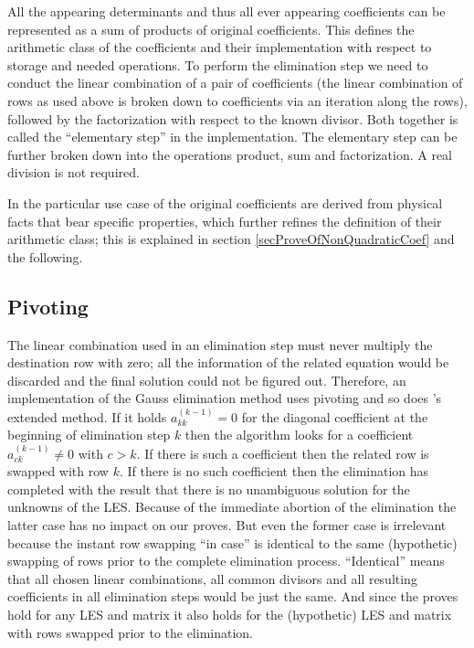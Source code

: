 All the appearing determinants and thus all ever appearing coefficients
can be represented as a sum of products of original coefficients. This
defines the arithmetic class of the coefficients and their implementation
with respect to storage and needed operations. To perform the elimination
step we need to conduct the linear combination of a pair of coefficients
(the linear combination of rows as used above is broken down to
coefficients via an iteration along the rows), followed by the
factorization with respect to the known divisor. Both together is called
the ``elementary step'' in the implementation. The elementary step can be
further broken down into the operations product, sum and factorization. A
real division is not required.

In the particular use case of \linnet{} the original coefficients are
derived from physical facts that bear specific properties, which further
refines the definition of their arithmetic class; this is explained in
section \ref{secProveOfNonQuadraticCoef} and the following.


\subsection{Pivoting}

The linear combination used in an elimination step must never multiply the
destination row with zero; all the information of the related equation
would be discarded and the final solution could not be figured out.
Therefore, an implementation of the Gauss elimination method uses pivoting
and so does \linnet{}'s extended method. If it holds $a^{(k-1)}_{kk} = 0$
for the diagonal coefficient at the beginning of elimination step $k$ then
the algorithm looks for a coefficient $a^{(k-1)}_{ck} \neq 0$ with $c >
k$. If there is such a coefficient then the related row is swapped with
row $k$. If there is no such coefficient then the elimination has
completed with the result that there is no unambiguous solution for the
unknowns of the LES. Because of the immediate abortion of the elimination
the latter case has no impact on our proves. But even the former case is
irrelevant because the instant row swapping ``in case'' is identical to
the same (hypothetic) swapping of rows prior to the complete elimination
process. ``Identical'' means that all chosen linear combinations, all
common divisors and all resulting coefficients in all elimination
steps would be just the same. And since the proves hold for any LES and
matrix it also holds for the (hypothetic) LES and matrix with rows
swapped prior to the elimination.


